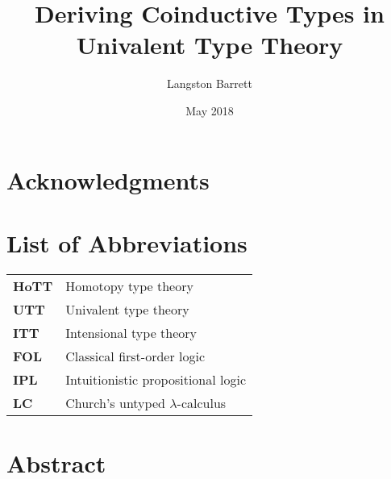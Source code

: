 \documentclass[12pt,twoside,draft]{reedthesis}
\title{Deriving Coinductive Types in Univalent Type Theory}
\author{Langston Barrett}
\date{May 2018}
\begin{document}
\maketitle
\frontmatter %
\pagestyle{empty} %

\chapter*{Acknowledgments}


\chapter*{List of Abbreviations}

\begin{table}[h]
  \centering
  \begin{tabular}{ll}
    \textbf{HoTT}  	&  Homotopy type theory \\
    \textbf{UTT}  	&  Univalent type theory \\
    \textbf{ITT}  	&  Intensional type theory \\
    \textbf{FOL}  	&  Classical first-order logic \\
    \textbf{IPL}  	&  Intuitionistic propositional logic \\
    \textbf{LC}  	  &  Church's untyped $\lambda$-calculus
  \end{tabular}
\end{table}
	
\setcounter{tocdepth}{4}
\tableofcontents

\chapter*{Abstract}
\end{document}
